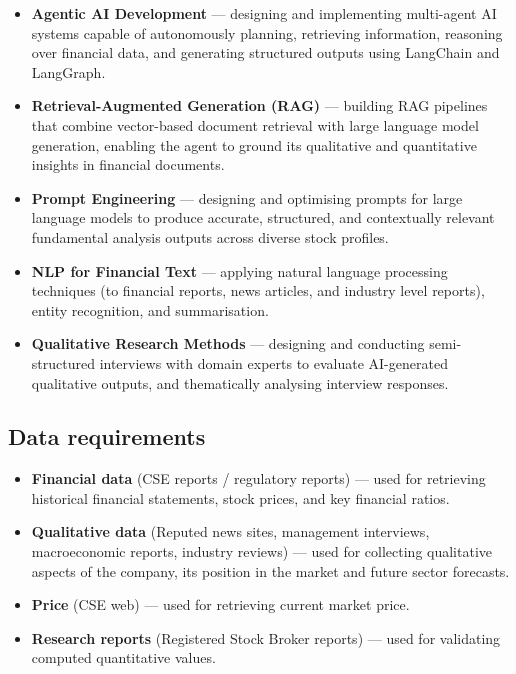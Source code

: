 \begin{itemize}
    \item \textbf{Agentic AI Development} --- designing and implementing 
    multi-agent AI systems capable of autonomously planning, retrieving 
    information, reasoning over financial data, and generating structured 
    outputs using LangChain and LangGraph.

    \item \textbf{Retrieval-Augmented Generation (RAG)} --- building RAG 
    pipelines that combine vector-based document retrieval with large 
    language model generation, enabling the agent to ground its qualitative and quantitative
    insights in financial documents.

    \item \textbf{Prompt Engineering} --- designing and optimising prompts 
    for large language models to produce accurate, structured, and 
    contextually relevant fundamental analysis outputs across 
    diverse stock profiles.

    \item \textbf{NLP for Financial Text} --- applying natural language 
    processing techniques (to financial reports, news articles, and 
    industry level reports), entity recognition, 
    and summarisation.

    \item \textbf{Qualitative Research Methods} --- designing and conducting 
    semi-structured interviews with domain experts to evaluate 
    AI-generated qualitative outputs, and thematically analysing 
    interview responses.
\end{itemize}

\subsection{Data requirements}

\begin{itemize}
    \item \textbf{Financial data} (CSE reports / regulatory reports) --- used for retrieving 
    historical financial statements, stock prices, and key financial ratios.

    \item \textbf{Qualitative data} (Reputed news sites, management interviews, macroeconomic reports, industry reviews) 
    --- used for collecting qualitative aspects of the company, its position in the market and future sector forecasts.

    \item \textbf{{Price}} (CSE web) --- used for retrieving 
    current market price.

    \item \textbf{{Research reports}} (Registered Stock Broker reports) --- used for validating computed quantitative values.
\end{itemize}

